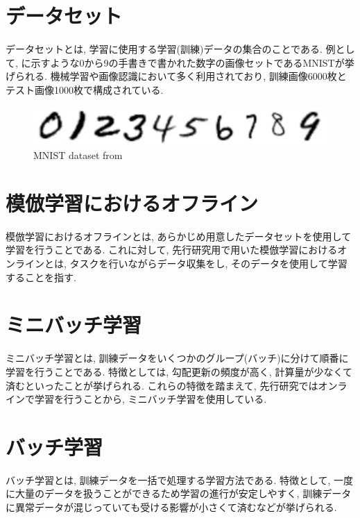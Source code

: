 \newpage
\section{データセット}
データセットとは, 学習に使用する学習(訓練)データの集合のことである. 例として, に示すような0から9の手書きで書かれた数字の画像セットであるMNISTが挙げられる. 機械学習や画像認識において多く利用されており, 訓練画像6000枚とテスト画像1000枚で構成されている. 

\vspace{5mm}

\begin{figure}[h]
     \centering
     \includegraphics[keepaspectratio, scale=0.5]
     {images/mnist.png}
     \caption{MNIST dataset from \cite{mnist}}
     \label{Fig:mnist}
     \end{figure}

\section{模倣学習におけるオフライン}
模倣学習におけるオフラインとは, あらかじめ用意したデータセットを使用して学習を行うことである. これに対して, 先行研究用で用いた模倣学習におけるオンラインとは, タスクを行いながらデータ収集をし, そのデータを使用して学習することを指す. 

\section{ミニバッチ学習}
ミニバッチ学習とは, 訓練データをいくつかのグループ(バッチ)に分けて順番に学習を行うことである. 特徴としては, 勾配更新の頻度が高く, 計算量が少なくて済むといったことが挙げられる. これらの特徴を踏まえて, 先行研究ではオンラインで学習を行うことから, ミニバッチ学習を使用している.
\section{バッチ学習}
バッチ学習とは, 訓練データを一括で処理する学習方法である. 特徴として, 一度に大量のデータを扱うことができるため学習の進行が安定しやすく, 訓練データに異常データが混じっていても受ける影響が小さくて済むなどが挙げられる. 